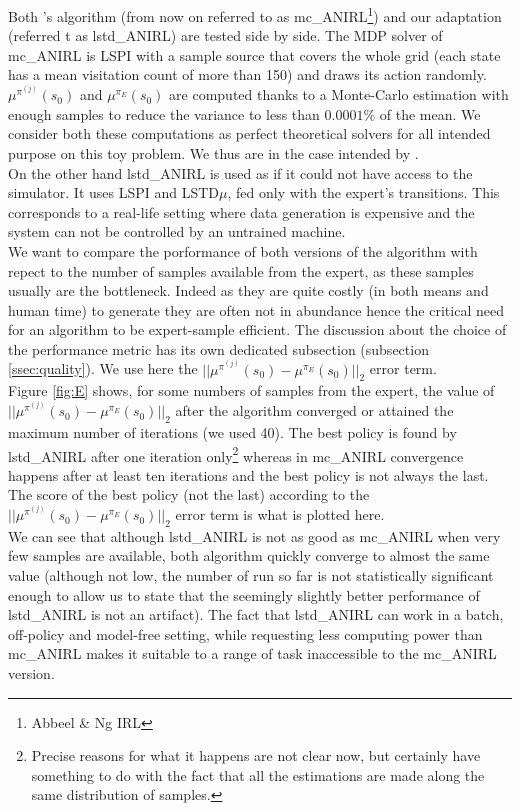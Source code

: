 \documentclass{jfpda2011}
\begin{document}
Both \citet{abbeel2004apprenticeship}'s algorithm (from now on referred to as mc\_ANIRL\footnote{Abbeel \& Ng IRL}) and our adaptation (referred t as lstd\_ANIRL) are tested side by side. The MDP solver of mc\_ANIRL is LSPI with a sample source that covers the whole grid (each state has a mean visitation count of more than 150) and draws its action randomly. $\mu^{\pi^(j)}(s_0)$ and $\mu^{\pi_E}(s_0)$ are computed thanks to a Monte-Carlo estimation with enough samples to reduce the variance to less than $0.0001\%$ of the mean. We consider both these computations as perfect theoretical solvers for all intended purpose on this toy problem. We thus are in the case intended by \citet{abbeel2004apprenticeship}.\\
On the other hand lstd\_ANIRL is used as if it could not have access to the simulator. It uses LSPI and LSTD$\mu$, fed only with the expert's transitions. This corresponds to a real-life setting where data generation is expensive and the system can not be controlled by an untrained machine.\\

We want to compare the porformance of both versions of the algorithm with repect to the number of samples available from the expert, as these samples usually are the bottleneck. Indeed as they are quite costly (in both means and human time) to generate they are often not in abundance hence the critical need for an algorithm to be expert-sample efficient. The discussion about the choice of the performance metric has its own dedicated subsection (subsection \ref{ssec:quality}). We use here the $||\mu^{\pi^(j)}(s_0) - \mu^{\pi_E}(s_0)||_2$ error term.\\

Figure \ref{fig:E} shows, for some numbers of samples from the expert, the value of $||\mu^{\pi^(j)}(s_0)-\mu^{\pi_E}(s_0)||_2$ after the algorithm converged or attained the maximum number of iterations (we used 40). The best policy is found by lstd\_ANIRL after one iteration only\footnote{Precise reasons for what it happens are not clear now, but certainly have something to do with the fact that all the estimations are made along the same distribution of samples.} whereas in mc\_ANIRL convergence happens after at least ten iterations and the best policy is not always the last. The score of the best policy (not the last) according to the $||\mu^{\pi^{(j)}}(s_0) - \mu^{\pi_E}(s_0)||_2$ error term is what is plotted here.\\

We can see that although lstd\_ANIRL is not as good as mc\_ANIRL when very few samples are available, both algorithm quickly converge to almost the same value (although not low, the number of run so far is not statistically significant enough to allow us to state that the seemingly slightly better performance of lstd\_ANIRL is not an artifact). The fact that lstd\_ANIRL can work in a batch, off-policy and model-free setting, while requesting less computing power than mc\_ANIRL makes it suitable to a range of task inaccessible to the mc\_ANIRL version.
\end{document}
